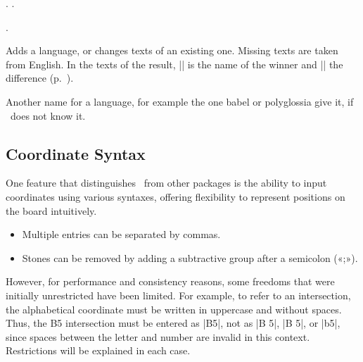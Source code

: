 \begin{goban}[9, stone = {radius = 4pt}, mark = {line = {color = red}}]
\begin{command}{\pgfgotext{}}
	\begin{codeexample}[]
		. .

		.
	\end{codeexample}
\end{command}

\begin{command}{\pgfgodefinelanguage{}}
	Adds a language, or changes texts of an existing one. Missing texts are taken from English. In the texts of the result, |\pgfgowinner| is the name of the winner and |\pgfgopoints| the difference (p.~\pageref{subsec:sgf}).

	\begin{codeexample}
	\end{codeexample}
\end{command}

\begin{command}{\pgfgolanguagealias{}}
	Another name for a language, for example the one babel or polyglossia give it, if \pgfgoname\ does not know it.

	\begin{codeexample}
	\end{codeexample}
\end{command}

\subsection{Coordinate Syntax}
\label{subsec:coordinate-syntax}

One feature that distinguishes \pgfgoname\ from other packages is the ability to input coordinates using various syntaxes, offering flexibility to represent positions on the board intuitively.
\begin{itemize}
	\item Multiple entries can be separated by commas.
	\item Stones can be removed by adding a subtractive group after a semicolon («;»).
\end{itemize}

However, for performance and consistency reasons, some freedoms that were initially unrestricted have been limited. For example, to refer to an intersection, the alphabetical coordinate must be written in uppercase and without spaces. Thus, the B5 intersection must be entered as |B5|, not as |B 5|, |B  5|, or |b5|, since spaces between the letter and number are invalid in this context. Restrictions will be explained in each case.


\end{goban}
